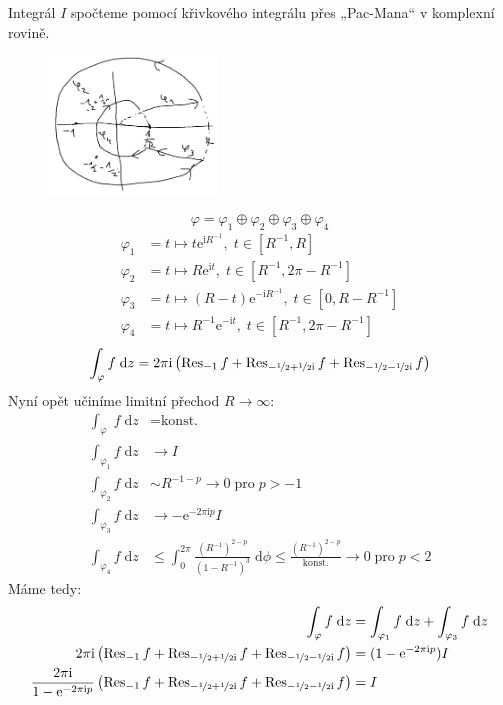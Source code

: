 \documentclass[10pt,a4paper]{article}
\def\ph{\phantom}
\newcommand{\const}[1]{\text{#1}}
\newcommand{\Res}{\operatorname{Res}}
\renewcommand{\d}[1]{\;\const{d}#1}
\newcommand{\e}[1]{\const{e}^{#1}}
\renewcommand{\i}{\const{i}}
\begin{document}
Integrál $I$ spočteme pomocí křivkového integrálu přes „Pac-Mana“ v komplexní rovině.
\begin{figure}[H]
    \centering
    \includegraphics[width=0.4\textwidth]{du3_2.PNG}
\end{figure}
\begin{equation*}
    \varphi = \varphi_1 \oplus \varphi_2 \oplus \varphi_3 \oplus \varphi_4
\end{equation*}
\begin{align*}
    \varphi_1 &= t \mapsto t \e{\i R^{-1}}, \; t \in [R^{-1}, R] \\
    \varphi_2 &= t \mapsto R \e{\i t}, \; t \in [R^{-1}, 2\pi - R^{-1}] \\
    \varphi_3 &= t \mapsto (R - t) \e{-\i R^{-1}}, \; t \in [0, R - R^{-1}] \\
    \varphi_4 &= t \mapsto R^{-1} \e{-\i t}, \; t \in [R^{-1}, 2\pi - R^{-1}]
\end{align*}
\begin{equation*}
    \int_\varphi f \d{z} = 2\pi\i \left(
        \Res_{-1} f +
        \Res_{-\nicefrac{1}{2} + \nicefrac{1}{2} \i} f +
        \Res_{-\nicefrac{1}{2} - \nicefrac{1}{2} \i} f
    \right)
\end{equation*}
Nyní opět učiníme limitní přechod $R \to \infty$:
\begin{align*}
    \int_{\varphi_{\ph{1}}} f \d{z} &= \const{konst.} \\
    \int_{\varphi_1} f \d{z} &\to I \\
    \int_{\varphi_2} f \d{z} &\sim R^{-1-p} \to 0 \; \mathrm{pro} \; p>-1\\
    \int_{\varphi_3} f \d{z} &\to -\e{-2\pi\i p} I \\
    \int_{\varphi_4} f \d{z} &\leq \int_0^{2\pi} \frac{(R^{-1})^{2-p}}{(1-R^{-1})^3} \d{\phi} \leq \frac{(R^{-1})^{2-p}}{\const{konst.}} \to 0 \; \mathrm{pro} \; p<2
\end{align*}
Máme tedy:
\begin{align*}
    \int_\varphi f \d{z} &= \int_{\varphi_1} f \d{z} + \int_{\varphi_3} f \d{z}
    \\
    2\pi\i \left(
        \Res_{-1} f +
        \Res_{-\nicefrac{1}{2} + \nicefrac{1}{2} \i} f +
        \Res_{-\nicefrac{1}{2} - \nicefrac{1}{2} \i} f
    \right)
    &= (1 - \e{-2\pi\i p}) I
    \\
    \frac{2\pi\i}{1 - \e{-2\pi\i p}} \left(
        \Res_{-1} f +
        \Res_{-\nicefrac{1}{2} + \nicefrac{1}{2} \i} f +
        \Res_{-\nicefrac{1}{2} - \nicefrac{1}{2} \i} f
    \right)
    &= I
\end{align*}
\end{document}
